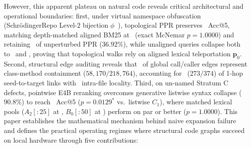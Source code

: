 \documentclass[10pt]{article}
\begin{document}
However, this apparent plateau on natural code reveals critical architectural and operational boundaries: first, under virtual namespace obfuscation (Schr{\"o}dingerRepo Level-2 bijection $\phi$~\cite{chen2024schrodinger}), topological PPR preserves \HonestLevelTwoConsistentPPRAccFive\ Acc@5, matching depth-matched aligned BM25 at \HonestLevelTwoConsistentBMTwentyFiveAccFive\ (exact McNemar $p=1.0000$) and retaining \HonestLevelTwoConsistentPPRRetentionPct\ of unperturbed PPR ($36.92\%$), while unaligned queries collapse both to \HonestLevelTwoUnalignedPPRAccFive\ and \HonestLevelTwoUnalignedBMTwentyFiveAccFive, proving that topological walks rely on aligned lexical teleportation $\mathbf{p}_0$. Second, structural edge auditing reveals that \HonestContainmentGlobalFraction\ of global call/caller edges represent class-method containment ($58{,}170/218{,}764$), accounting for \HonestContainmentOneHopPct\ ($273/374$) of 1-hop seed-to-target links with \HonestContainmentOneHopIntraFilePct\ intra-file locality. Third, on un-named Stratum C defects, pointwise E4B reranking overcomes generative listwise syntax collapse ($90.8\%$) to reach \HonestEFourBAFourFifteenAccFive\ Acc@5 ($p=0.0129^*$ vs.\ listwise $C_1$), where matched lexical pools ($A_2[:25]$ at \HonestEFourBATwoTwentyFiveAccFive, $B_0[:50]$ at \HonestEFourBBZeroFiftyAccFive) perform on par or better ($p=1.0000$). This paper establishes the mathematical mechanism behind naive expansion failure and defines the practical operating regimes where structural code graphs succeed on local hardware through five contributions:
\end{document}
